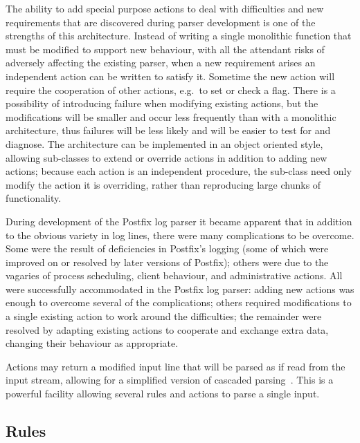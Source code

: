 \documentclass{svmult}
\begin{document}
The ability to add special purpose actions to deal with difficulties and
new requirements that are discovered during parser development is one of
the strengths of this architecture.  Instead of writing a single monolithic
function that must be modified to support new behaviour, with all the
attendant risks of adversely affecting the existing parser, when a new
requirement arises an independent action can be written to satisfy it.  
Sometime the new action will require the cooperation of other actions,
e.g.\ to set or check a flag.  There is a possibility of introducing
failure when modifying existing actions, but the modifications will be
smaller and occur less frequently than with a monolithic architecture, thus
failures will be less likely and will be easier to test for and diagnose.
The architecture can be implemented in an object oriented style, allowing
sub-classes to extend or override actions in addition to adding new
actions; because each action is an independent procedure, the sub-class
need only modify the action it is overriding, rather than reproducing large
chunks of functionality.

During development of the Postfix log parser it became apparent that in
addition to the obvious variety in log lines, there were many 
complications to be overcome.  Some were the result of deficiencies in
Postfix's logging (some of which were improved on or resolved by later
versions of Postfix); others were due to the vagaries of process
scheduling, client behaviour, and administrative actions.  All were
successfully accommodated in the Postfix log parser: adding new actions was
enough to overcome several of the complications; others required
modifications to a single existing action to work around the difficulties;
the remainder were resolved by adapting existing actions to cooperate and
exchange extra data, changing their behaviour as appropriate.

Actions may return a modified input line that will be parsed as if read
from the input stream, allowing for a simplified version of cascaded
parsing~\cite{cascaded-parsing}.  This is a powerful facility allowing 
several rules and actions to parse a single input.

\subsection{Rules}

\label{Rules}
\end{document}
